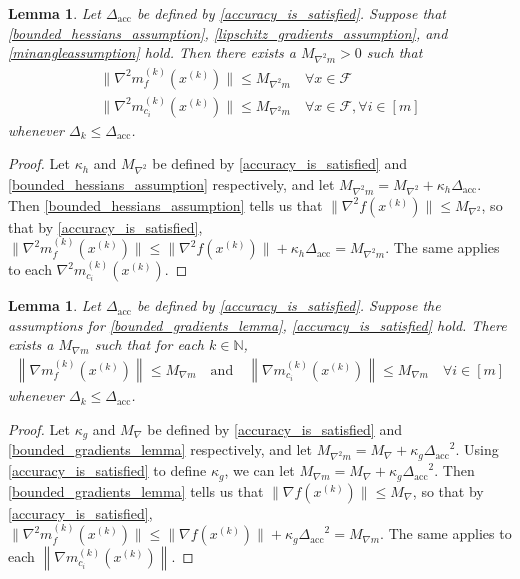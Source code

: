 \documentclass{article}
\newtheorem{lemma}[theorem]{Lemma}
\theoremstyle{case}
\numberwithin{theorem}{subsection}
\newcommand{\dacc}{{\Delta_{\textrm{acc}}}}
\newcommand{\dk}{\Delta_k}
\newcommand{\feasible}{{\mathcal F}}
\newcommand{\gk}{{\nabla m_f^{(k)}\left(\xk\right)}}
\newcommand{\gmcik}{{\nabla m_{c_i}^{(k)}\left(\xk\right)}}
\newcommand{\hk}{{\nabla^2m_f^{(k)}\left(\xk\right)}}
\newcommand{\maxgrad}{{M_{\nabla}}}
\newcommand{\maxhessian}{{M_{\nabla^2}}}
\newcommand{\maxmodelhessian}{{M_{\nabla^2 m}}}
\newcommand{\naturals}{\mathbb N}
\newcommand{\xk}{x^{(k)}}
\newcommand{\maxmodelgrad}{{M_{\nabla m}}}
\begin{document}
\begin{lemma}
\label{bounded_model_hessian_lemma}
Let $\dacc$ be defined by \cref{accuracy_is_satisfied}.
Suppose that \cref{bounded_hessians_assumption}, \cref{lipschitz_gradients_assumption}, and \cref{minangleassumption} hold.
Then there exists a $\maxmodelhessian > 0$ such that 
\begin{align*}
\| \hk \| \le \maxmodelhessian \quad \forall x \in \feasible \\
\|\nabla^2 m_{c_i}^{(k)}(\xk) \| \le \maxmodelhessian \quad \forall x \in \feasible, \forall i \in [m]
\end{align*}
whenever $\dk \le \dacc$.
\end{lemma}

\begin{proof}
Let $\kappa_h$ and $\maxhessian$ be defined by \cref{accuracy_is_satisfied} and \cref{bounded_hessians_assumption} respectively,
and let $\maxmodelhessian = \maxhessian + \kappa_h \dacc$.
Then \cref{bounded_hessians_assumption} tells us that
$\|\nabla^2 f(\xk)\| \le \maxhessian$, so that by \cref{accuracy_is_satisfied},
$\|\hk\| \le \|\nabla^2 f(\xk)\| + \kappa_h\dacc = \maxmodelhessian$.
The same applies to each $\nabla^2 m_{c_i}^{(k)}(\xk)$.
\end{proof}

\begin{lemma}
\label{i_thought_i_proved_this_already}
Let $\dacc$ be defined by \cref{accuracy_is_satisfied}.
Suppose the assumptions for
\cref{bounded_gradients_lemma},
\cref{accuracy_is_satisfied}
hold.
There exists a $\maxmodelgrad$ such that for each $k \in \naturals$, 
\begin{align*}
\left\| \gk \right\| \le \maxmodelgrad \quad
\textrm{and} \quad \left\|\gmcik\right\| \le \maxmodelgrad \quad \forall i \in [m]
\end{align*}
whenever $\dk \le \dacc$.
\end{lemma}
\begin{proof}
Let $\kappa_g$ and $\maxgrad$ be defined by \cref{accuracy_is_satisfied} and \cref{bounded_gradients_lemma} respectively,
and let $\maxmodelhessian = \maxgrad + \kappa_g \dacc^2$.
Using \cref{accuracy_is_satisfied} to define $\kappa_g$, we can let $\maxmodelgrad = \maxgrad + \kappa_g \dacc^2$.
Then \cref{bounded_gradients_lemma} tells us that
$\|\nabla f(\xk)\| \le \maxgrad$, so that by \cref{accuracy_is_satisfied},
$\|\hk\| \le \|\nabla f(\xk)\| + \kappa_g\dacc^2 = \maxmodelgrad$.
The same applies to each $\left\|\gmcik\right\|$.
\end{proof}
\end{document}
